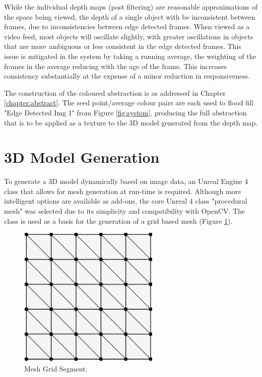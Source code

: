 While the individual depth maps (post filtering) are reasonable approximations of the space being viewed, the depth of a single object with be inconsistent between frames, due to inconsistencies between edge detected frames. When viewed as a video feed, most objects will oscillate slightly, with greater oscillations in objects that are more ambiguous or less consistent in the edge detected frames. This issue is mitigated in the system by taking a running average, the weighting of the frames in the average reducing with the age of the frame. This increases consistency substantially at the expense of a minor reduction in responsiveness.

The construction of the coloured abstraction is as addressed in Chapter \ref{chapter:abstract}. The seed point/average colour pairs are each used to flood fill "Edge Detected Img 1" from Figure \ref{fig:system}, producing the full abstraction that is to be applied as a texture to the 3D model generated from the depth map.

\section{3D Model Generation}

To generate a 3D model dynamically based on image data, an Unreal Engine 4 class that allows for mesh generation at run-time is required. Although more intelligent options are available as add-ons, the core Unreal 4 class "procedural mesh" was selected due to its simplicity and compatibility with OpenCV. The class is used as a basis for the generation of a grid based mesh (Figure \ref{fig:mesh}).

\begin{figure}[H]
    \begin{center}
      \includegraphics[width=0.6\textwidth]{Figures/mesh.png}
      \caption[Mesh Grid Segment]{Mesh Grid Segment.}
      \label{fig:mesh}
    \end{center}
\end{figure}

